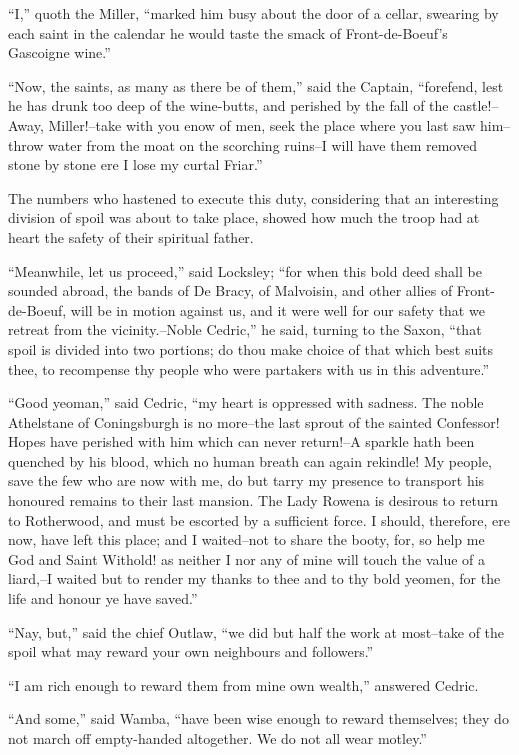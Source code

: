 ``I,'' quoth the Miller, ``marked him busy about the door of a cellar,
swearing by each saint in the calendar he would taste the smack of
Front-de-Boeuf's Gascoigne wine.''

``Now, the saints, as many as there be of them,'' said the Captain,
``forefend, lest he has drunk too deep of the wine-butts, and perished
by the fall of the castle!--Away, Miller!--take with you enow of men,
seek the place where you last saw him--throw water from the moat on the
scorching ruins--I will have them removed stone by stone ere I lose my
curtal Friar.''

The numbers who hastened to execute this duty, considering that an
interesting division of spoil was about to take place, showed how much
the troop had at heart the safety of their spiritual father.

``Meanwhile, let us proceed,'' said Locksley; ``for when this bold deed
shall be sounded abroad, the bands of De Bracy, of Malvoisin, and other
allies of Front-de-Boeuf, will be in motion against us, and it were well
for our safety that we retreat from the vicinity.--Noble Cedric,'' he
said, turning to the Saxon, ``that spoil is divided into two portions;
do thou make choice of that which best suits thee, to recompense thy
people who were partakers with us in this adventure.''

``Good yeoman,'' said Cedric, ``my heart is oppressed with sadness. The
noble Athelstane of Coningsburgh is no more--the last sprout of the
sainted Confessor! Hopes have perished with him which can never
return!--A sparkle hath been quenched by his blood, which no human
breath can again rekindle! My people, save the few who are now with me,
do but tarry my presence to transport his honoured remains to their last
mansion. The Lady Rowena is desirous to return to Rotherwood, and must
be escorted by a sufficient force. I should, therefore, ere now, have
left this place; and I waited--not to share the booty, for, so help me
God and Saint Withold! as neither I nor any of mine will touch the value
of a liard,--I waited but to render my thanks to thee and to thy bold
yeomen, for the life and honour ye have saved.''

``Nay, but,'' said the chief Outlaw, ``we did but half the work at
most--take of the spoil what may reward your own neighbours and
followers.''

``I am rich enough to reward them from mine own wealth,'' answered
Cedric.

``And some,'' said Wamba, ``have been wise enough to reward themselves;
they do not march off empty-handed altogether. We do not all wear
motley.''

